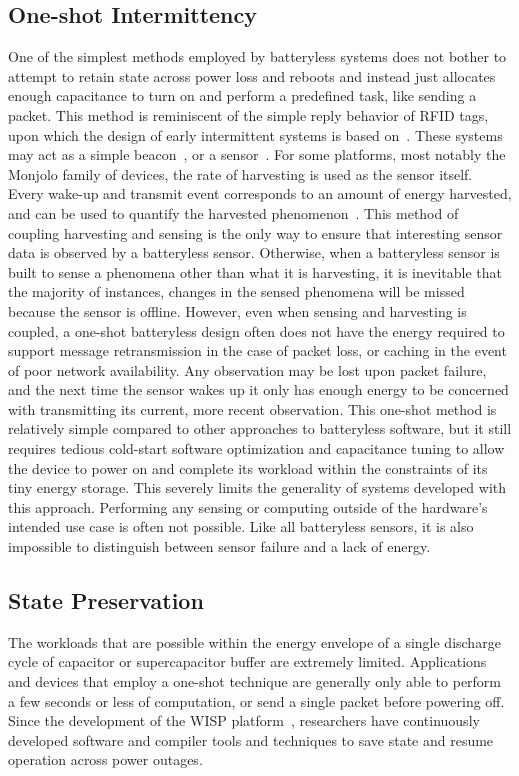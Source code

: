 \subsection{One-shot Intermittency}
One of the simplest methods employed by batteryless systems does not bother to attempt to retain state across power loss and reboots 
and instead just allocates enough capacitance to turn on and perform a predefined task, like sending a packet. 
This method is reminiscent of the simple reply behavior of RFID tags, upon which the design of early intermittent systems is based on~\cite{sample2008design}. 
These systems may act as a simple beacon~\cite{campbell2016cinamin,saoda2019no}, or a sensor~\cite{yervaGrafting12, debruin2013monjolo, campbellEnergy14, campbellThermes14}.
For some platforms, most notably the Monjolo family of devices, the rate of harvesting is used as the sensor itself. Every wake-up and transmit event corresponds to an amount of energy harvested, and can be used to quantify the harvested phenomenon~\cite{campbellThermes14, campbellEnergy14, debruin2013monjolo}.
This method of coupling harvesting and sensing is the only way to ensure that interesting sensor data is observed by a batteryless sensor. 
Otherwise, when a batteryless sensor is built to sense a phenomena other than what it is harvesting, it is inevitable that the majority of instances, changes in the sensed phenomena will be missed because the sensor is offline. 
However, even when sensing and harvesting is coupled, a one-shot batteryless design often does not have the energy required to support message retransmission in the case of packet loss, or caching in the event of poor network availability. Any observation may be lost upon packet failure, and the next time the sensor wakes up it only has enough energy to be concerned with transmitting its current, more recent observation.
This one-shot method is relatively simple compared to other approaches to batteryless software, but it still requires tedious cold-start software optimization and capacitance tuning to allow the device to power on and complete its workload within the constraints of its tiny energy storage.
This severely limits the generality of systems developed with this approach. 
Performing any sensing or computing outside of the hardware's intended use case is often not possible.
Like all batteryless sensors, it is also impossible to distinguish between sensor failure and a lack of energy.

\subsection{State Preservation}
The workloads that are possible within the energy envelope of a single discharge cycle of capacitor or supercapacitor buffer are extremely limited. 
Applications and devices that employ a one-shot technique are generally only able to perform a few seconds or less of computation, or send a single packet before powering off.
Since the development of the WISP platform~\cite{sample2008design}, researchers have continuously developed software and compiler tools and techniques to save state and resume operation across power outages.

